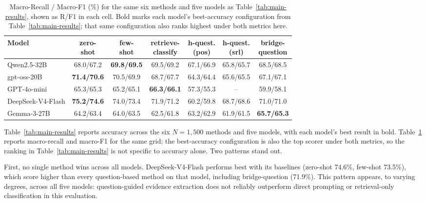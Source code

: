 \documentclass[11pt]{article}
\begin{document}
\begin{table}[t]
\centering
\small
\renewcommand{\arraystretch}{0.92}
\setlength{\tabcolsep}{6pt}
\begin{tabular}{lcccccc}
\toprule
Model & \makecell{zero-\\shot} & \makecell{few-\\shot} & \makecell{retrieve-\\classify} & \makecell{h-quest.\\(pos)} & \makecell{h-quest.\\(srl)} & \makecell{bridge-\\question} \\
\midrule
Qwen2.5-32B        & 68.0/67.2     & \textbf{69.8/69.5} & 69.5/69.2 & 67.1/66.9 & 65.8/65.7 & 68.5/68.5 \\
gpt-oss-20B        & \textbf{71.4/70.6} & 70.5/69.9     & 68.7/67.7 & 64.3/64.4 & 65.6/65.5 & 67.1/67.1 \\
GPT-4o-mini        & 65.3/65.3     & 65.2/65.1          & \textbf{66.3/66.1} & 57.3/55.3 & -- & 59.9/58.1 \\
DeepSeek-V4-Flash  & \textbf{75.2/74.6} & 74.0/73.4     & 71.9/71.2 & 60.2/59.8 & 68.7/68.6 & 71.0/71.0 \\
Gemma-3-27B        & 64.2/63.4     & 64.0/63.5          & 62.5/61.8 & 63.2/62.9 & 61.9/61.5 & \textbf{65.7/65.3} \\
\bottomrule
\end{tabular}
\caption{Macro-Recall / Macro-F1 (\%) for the same six methods and five
models as Table~\ref{tab:main-results}, shown as R/F1 in each cell. Bold
marks each model's best-accuracy configuration from
Table~\ref{tab:main-results}; that same configuration also ranks highest
under both metrics here.}
\label{tab:main-results-f1}
\end{table}

Table~\ref{tab:main-results} reports accuracy across the six $N=1{,}500$
methods and five models, with each model's best result in bold.
Table~\ref{tab:main-results-f1} reports macro-recall and macro-F1 for the
same grid; the best-accuracy configuration is also the top scorer under both
metrics, so the ranking in Table~\ref{tab:main-results} is not specific to
accuracy alone. Two patterns stand out.

First, no single method wins across all models. DeepSeek-V4-Flash performs
best with its baselines (zero-shot 74.6\%, few-shot 73.5\%), which score
higher than every question-based method on that model, including
bridge-question (71.9\%). This pattern appears, to varying degrees, across
all five models: question-guided evidence extraction does not reliably
outperform direct prompting or retrieval-only classification in this
evaluation.
\end{document}
